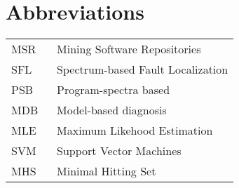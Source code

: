 \chapter*{Abbreviations}

\begin{flushleft}
\begin{tabular}{l p{0.8\linewidth}}
MSR 	& Mining Software Repositories\\
SFL 	& Spectrum-based Fault Localization \\
PSB		& Program-spectra based\\
MDB		& Model-based diagnosis\\
MLE 	& Maximum Likehood Estimation\\
SVM 	& Support Vector Machines\\
MHS		& Minimal Hitting Set\\
\end{tabular}
\end{flushleft}

